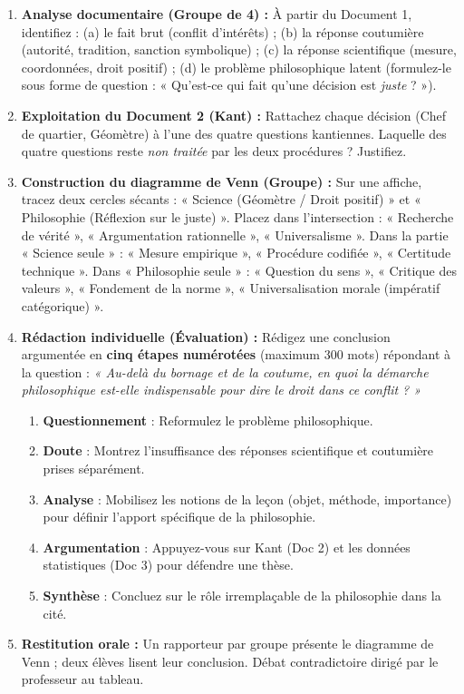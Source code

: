 \documentclass[11pt]{article}
\newcommand{\cle}[1]{{\popxbold\color{popdark}#1}}
\newcounter{popsec}
\newcounter{popsub}
\newcommand{\courssub}[1]{%
  \stepcounter{popsub}%
  \par\vspace{9pt}\noindent{\popxbold\fontsize{11.5}{13}\selectfont\color{popink}{\color{poporange}\thepopsec.\thepopsub}\hspace{6pt}#1}\par\nopagebreak\vspace{4pt}
}
\begin{document}
\courssub{Consignes}
\begin{enumerate}
    \item \textbf{Analyse documentaire (Groupe de 4) :} À partir du Document 1, identifiez : (a) le \cle{fait brut} (conflit d'intérêts) ; (b) la \cle{réponse coutumière} (autorité, tradition, sanction symbolique) ; (c) la \cle{réponse scientifique} (mesure, coordonnées, droit positif) ; (d) le \cle{problème philosophique} latent (formulez-le sous forme de question : « Qu'est-ce qui fait qu'une décision est \emph{juste} ? »).
    \item \textbf{Exploitation du Document 2 (Kant) :} Rattachez chaque décision (Chef de quartier, Géomètre) à l'une des quatre questions kantiennes. Laquelle des quatre questions reste \emph{non traitée} par les deux procédures ? Justifiez.
    \item \textbf{Construction du diagramme de Venn (Groupe) :} Sur une affiche, tracez deux cercles sécants : « \cle{Science} (Géomètre / Droit positif) » et « \cle{Philosophie} (Réflexion sur le juste) ». Placez dans l'intersection : « Recherche de vérité », « Argumentation rationnelle », « Universalisme ». Dans la partie « Science seule » : « Mesure empirique », « Procédure codifiée », « Certitude technique ». Dans « Philosophie seule » : « Question du sens », « Critique des valeurs », « Fondement de la norme », « Universalisation morale (impératif catégorique) ».
    \item \textbf{Rédaction individuelle (Évaluation) :} Rédigez une conclusion argumentée en \textbf{cinq étapes numérotées} (maximum 300 mots) répondant à la question : \emph{« Au-delà du bornage et de la coutume, en quoi la démarche philosophique est-elle indispensable pour dire le droit dans ce conflit ? »}
    \begin{enumerate}
        \item \textbf{Questionnement} : Reformulez le problème philosophique.
        \item \textbf{Doute} : Montrez l'insuffisance des réponses scientifique et coutumière prises séparément.
        \item \textbf{Analyse} : Mobilisez les notions de la leçon (objet, méthode, importance) pour définir l'apport spécifique de la philosophie.
        \item \textbf{Argumentation} : Appuyez-vous sur Kant (Doc 2) et les données statistiques (Doc 3) pour défendre une thèse.
        \item \textbf{Synthèse} : Concluez sur le rôle irremplaçable de la philosophie dans la cité.
    \end{enumerate}
    \item \textbf{Restitution orale :} Un rapporteur par groupe présente le diagramme de Venn ; deux élèves lisent leur conclusion. Débat contradictoire dirigé par le professeur au tableau.
\end{enumerate}
\end{document}
